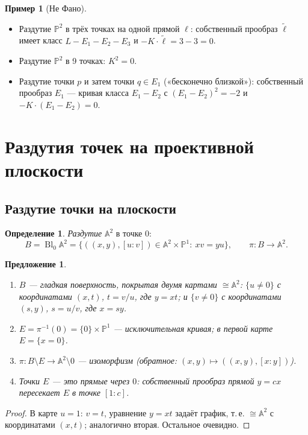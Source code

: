 \documentclass[11pt,a4paper]{article}
\theoremstyle{plain}
\newtheorem{proposition}[theorem]{Предложение}
\theoremstyle{definition}
\newtheorem{definition}[theorem]{Определение}
\newtheorem{example}[theorem]{Пример}
\theoremstyle{remark}
\newcommand{\PP}{\mathbb{P}}
\newcommand{\A}{\mathbb{A}}
\DeclareMathOperator{\Bl}{Bl}
\begin{document}
\begin{example}[Не Фано]
\begin{itemize}
\item Раздутие $\PP^2$ в трёх точках на одной прямой $\ell$: собственный прообраз $\tilde\ell$ имеет класс
$L-E_1-E_2-E_3$ и $-K\cdot\tilde\ell=3-3=0$.
\item Раздутие $\PP^2$ в 9 точках: $K^2=0$.
\item Раздутие точки $p$ и затем точки $q\in E_1$ («бесконечно близкой»): собственный прообраз $E_1$ ---
кривая класса $E_1-E_2$ с $(E_1-E_2)^2=-2$ и $-K\cdot(E_1-E_2)=0$.
\end{itemize}
\end{example}

\section{Раздутия точек на проективной плоскости}\label{sec:blowup}

\subsection{Раздутие точки на плоскости}

\begin{definition}
\emph{Раздутие} $\A^2$ в точке $0$:
\[
B=\Bl_0\A^2=\{((x,y),[u:v])\in\A^2\times\PP^1:\ xv=yu\},\qquad\pi\colon B\to\A^2 .
\]
\end{definition}

\begin{proposition}\label{prop:blowup-basic}
\begin{enumerate}
\item $B$ --- гладкая поверхность, покрытая двумя картами $\cong\A^2$:
$\{u\ne0\}$ с координатами $(x,t)$, $t=v/u$, где $y=xt$; и $\{v\ne0\}$ с координатами $(s,y)$, $s=u/v$,
где $x=sy$.
\item $E=\pi^{-1}(0)=\{0\}\times\PP^1$ --- \emph{исключительная кривая}; в первой карте $E=\{x=0\}$.
\item $\pi\colon B\setminus E\to\A^2\setminus0$ --- изоморфизм (обратное: $(x,y)\mapsto((x,y),[x:y])$).
\item Точки $E$ --- это прямые через $0$: собственный прообраз прямой $y=cx$ пересекает $E$ в точке $[1:c]$.
\end{enumerate}
\end{proposition}
\begin{proof}
В карте $u=1$: $v=t$, уравнение $y=xt$ задаёт график, т.\,е. $\cong\A^2$ с координатами $(x,t)$;
аналогично вторая. Остальное очевидно.
\end{proof}
\end{document}
